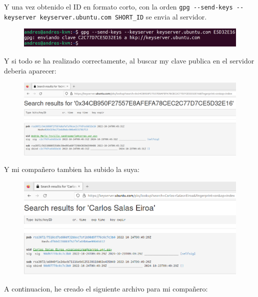 \documentclass{article}
\begin{document}
Y una vez obtenido el ID en formato corto, con la orden \verb|gpg --send-keys --keyserver keyserver.ubuntu.com SHORT_ID| se envia al servidor.

\begin{figure}[H]
    \includegraphics[width=\textwidth]{imagenes/Portatil/Captura desde 2022-10-24 11-58-08.png}
\end{figure}

Y si todo se ha realizado correctamente, al buscar my clave publica en el servidor deberia aparecer:


\begin{figure}[H]
    \includegraphics[width=\textwidth]{imagenes/Portatil/Captura desde 2022-10-24 12-01-53.png}
\end{figure}

Y mi compañero tambien ha subido la suya:

\begin{figure}[H]
    \includegraphics[width=\textwidth]{imagenes/Portatil/Captura desde 2022-10-24 12-05-30.png}
\end{figure}


A continuacion, he creado el siguiente archivo para mi compañero:
\end{document}
